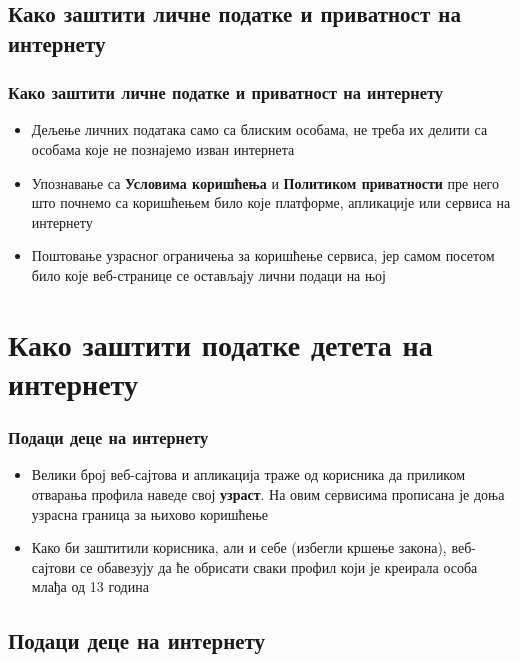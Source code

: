 \documentclass{beamer}
\begin{document}
\subsection{Како заштити личне податке и приватност на интернету}

\begin{frame}[fragile]\frametitle{Како заштити личне податке и приватност на интернету}
	\begin{itemize}	
		\item Дељење личних података само са блиским особама, не треба их делити са особама које не познајемо изван интернета
		\item Упознавање са \textbf{Условима коришћења} и \textbf{Политиком приватности} пре него што почнемо са коришћењем било које платформе, апликације или сервиса на интернету   
		\item Поштовање узрасног ограничења за коришћење сервиса, јер самом посетом било које веб-странице се остављају лични подаци на њој	
	\end{itemize}
\end{frame}


\section{Како заштити податке детета на интернету}

\begin{frame}[fragile]\frametitle{Подаци деце на интернету}
	\begin{itemize}	
		\item Велики број веб-сајтова и апликација траже од корисника да приликом отварања профила наведе свој \textbf{узраст}. На овим сервисима прописана је доња узрасна граница за њихово коришћење
		
		\item Како би заштитили корисника, али и себе (избегли кршење закона), веб-сајтови се обавезују да ће обрисати сваки профил који је креирала особа млађа од 13 година	
	\end{itemize}
\end{frame}


\subsection{Подаци деце на интернету}
\end{document}
